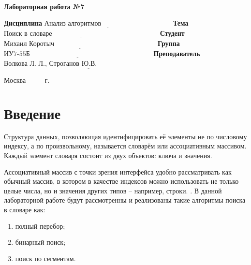 \documentclass[12pt]{report}
\begin{document}
\begin{center}
\Large\textbf{Лабораторная работа №7}
\end{center}
\vspace{\baselineskip}
\noindent\textbf{Дисциплина} $\underline{\text{Анализ алгоритмов~~~~~~~~~~~~~~~~~~~~~~~~~~~~~~~}}$\newline\newline
\noindent\textbf{Тема} $\underline{\text{Поиск в словаре~~~~~~~~~~~~~~~~~~~~~~~~~~~~~~~~~~~~~~~~~~~~~~~}}$\newline\newline
\noindent\textbf{Студент} $\underline{\text{Михаил Коротыч~~~~~~~~~~~~~~~~~~~~~~~~~~~~~~~~~~~~~~~~~~~~~}}$\newline\newline
\noindent\textbf{Группа} $\underline{\text{ИУ7-55Б~~~~~~~~~~~~~~~~~~~~~~~~~~~~~~~~~~~~~~~~~~~~~~~~~~~~~~}}$\newline\newline
\noindent\textbf{Преподаватель} $\underline{\text{Волкова Л. Л., Строганов Ю.В.~~~~~~~~~~~~~~~~~~~~~~~~~~~~~~~~~~}}$\newline

\begin{center}
	\vfill
	Москва~---~\the\year
	~г.
\end{center}
\clearpage

\tableofcontents

\newpage
\chapter*{Введение}
Структура данных, позволяющая идентифицировать её элементы не по числовому индексу, а по произвольному, называется словарём или ассоциативным массивом. Каждый элемент словаря состоит из двух объектов:
ключа и значения. 

Ассоциативный массив с точки зрения интерфейса удобно рассматривать как обычный массив, в котором в качестве индексов можно использовать не только целые числа, но и значения других типов – например, строки. \cite{dict}.
В данной лабораторной работе будут рассмотренны и реализованы такие алгоритмы поиска в словаре как:
\begin{enumerate}
	\item полный перебор;
	\item бинарный поиск;
	\item поиск по сегментам.
\end{enumerate}
\vspace{\baselineskip}
\end{document}
